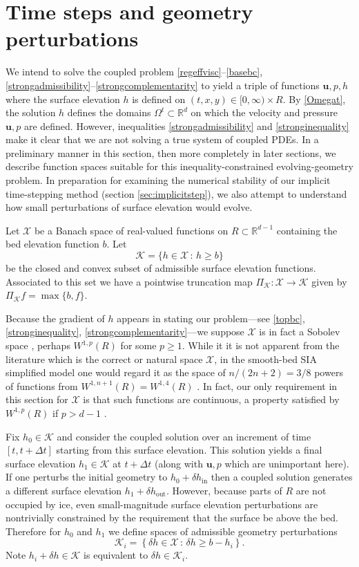 \documentclass[letterpaper,final,12pt,reqno]{amsart}
\newcommand{\RR}{\mathbb{R}}
\newcommand{\bu}{\mathbf{u}}
\newcommand{\PiK}{\Pi_{\mathcal{K}}}
\newcommand{\dhin}{\delta h_{\text{in}}}
\newcommand{\dhout}{\delta h_{\text{out}}}
\begin{document}
\section{Time steps and geometry perturbations} \label{sec:perturb}

We intend to solve the coupled problem \eqref{regeffvisc}--\eqref{basebc}, \eqref{strongadmissibility}--\eqref{strongcomplementarity} to yield a triple of functions $\bu,p,h$ where the surface elevation $h$ is defined on $(t,x,y) \in [0,\infty)\times R$.  By \eqref{Omegat}, the solution $h$ defines the domains $\Omega^t\subset \RR^d$ on which the velocity and pressure $\bu,p$ are defined.  However, inequalities \eqref{strongadmissibility} and \eqref{stronginequality} make it clear that we are not solving a true system of coupled PDEs.  In a preliminary manner in this section, then more completely in later sections, we describe function spaces suitable for this inequality-constrained evolving-geometry problem.  In preparation for examining the numerical stability of our implicit time-stepping method (section \ref{sec:implicitstep}), we also attempt to understand how small perturbations of surface elevation would evolve.

Let $\mathcal{X}$ be a Banach space of real-valued functions on $R \subset \RR^{d-1}$ containing the bed elevation function $b$.  Let
    $$\mathcal{K} = \{h \in \mathcal{X}\,:\,h \ge b\}$$
be the closed and convex subset of admissible surface elevation functions.  Associated to this set we have a pointwise truncation map $\PiK : \mathcal{X} \to \mathcal{K}$ given by $\PiK f = \max\{b,f\}$.

Because the gradient of $h$ appears in stating our problem---see \eqref{topbc}, \eqref{stronginequality}, \eqref{strongcomplementarity}---we suppose $\mathcal{X}$ is in fact a Sobolev space \cite{Evans2010}, perhaps $W^{1,p}(R)$ for some $p\ge 1$.  While it it is not apparent from the literature which is the correct or natural space $\mathcal{X}$, in the smooth-bed SIA simplified model one would regard it as the space of $n/(2n+2) = 3/8$ powers of functions from $W^{1,n+1}(R)=W^{1,4}(R)$ \cite{JouvetBueler2012}.  In fact, our only requirement in this section for $\mathcal{X}$ is that such functions are continuous, a property satisfied by $W^{1,p}(R)$ if $p>d-1$ \cite[theorem 5.6.5]{Evans2010}.

Fix $h_0 \in \mathcal{K}$ and consider the coupled solution over an increment of time $[t,t+\Delta t]$ starting from this surface elevation.  This solution yields a final surface elevation $h_1 \in \mathcal{K}$ at $t+\Delta t$ (along with $\bu,p$ which are unimportant here).  If one perturbs the initial geometry to $h_0+\dhin$ then a coupled solution generates a different surface elevation $h_1 + \dhout$.  However, because parts of $R$ are not occupied by ice, even small-magnitude surface elevation perturbations are nontrivially constrained by the requirement that the surface be above the bed.  Therefore for $h_0$ and $h_1$ we define spaces of admissible geometry perturbations
    $$\mathcal{K}_i = \left\{\delta h \in \mathcal{X} \,:\, \delta h \ge b - h_i\right\}.$$
Note $h_i+\delta h \in \mathcal{K}$ is equivalent to $\delta h \in \mathcal{K}_i$.
\end{document}
